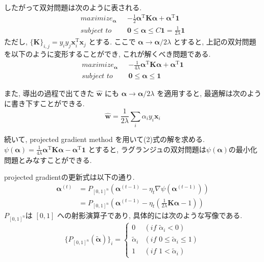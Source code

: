 \documentclass[a4paper,10pt]{jsarticle}
\begin{document}
したがって双対問題は次のように表される.
\begin{align*}
 maximize_{\bm{\alpha}} \,\,\,\,
 & -\frac{1}{2}\bm{\alpha}^\mathrm{T}\bm{K}\mathrm{\bm{\alpha}}
 + \bm{\alpha}^\mathrm{T}\bm{1}\\
 subject \,\, to \,\,\,\, &\bm{0} \leq \bm{\alpha} \leq C\bm{1}
 = \frac{1}{2\lambda}\bm{1}
\end{align*}
ただし, $\{\bm{K}\}_{i, j} = y_iy_j\bm{x}_i^\mathrm{T}\bm{x}_j$ とする.
ここで $\bm{\alpha} \rightarrow \bm{\alpha}/2\lambda$ とすると,
上記の双対問題を以下のように変形することができ, これが解くべき問題である.
\begin{align}
 maximize_{\bm{\alpha}} \,\,\,\,
 & -\frac{1}{4\lambda}\bm{\alpha}^\mathrm{T}\bm{K}\mathrm{\bm{\alpha}}
 + \bm{\alpha}^\mathrm{T}\bm{1}\\
 subject \,\, to \,\,\,\, &\bm{0} \leq \bm{\alpha} \leq \bm{1}
\end{align}

また, 導出の過程で出てきた $\hat{\bm{w}}$ にも
$\bm{\alpha} \rightarrow \bm{\alpha}/2\lambda$ を適用すると,
最適解は次のように書き下すことができる.
\[ \hat{\bm{w}} = \frac{1}{2\lambda}\sum_{i}\alpha_iy_i\bm{x}_i \]

続いて, projected gradient method を用いて(2)式の解を求める.
$\psi(\bm{\alpha}) = \frac{1}{4\lambda}\bm{\alpha}^\mathrm{T}\bm{K}\mathrm{\bm{\alpha}}
 - \bm{\alpha}^\mathrm{T}\bm{1}$
とすると, ラグランジュの双対問題は$\psi(\bm{\alpha})$の最小化問題とみなすことができる.

projected gradientの更新式は以下の通り.
\begin{align*}
 \bm{\alpha}^{(t)}
 & = P_{[0,1]^n}(\bm{\alpha}^{(t-1)} - \eta_t\nabla\psi(\bm{\alpha}^{(t-1)}))\\
 & = P_{[0,1]^n}\left(\bm{\alpha}^{(t-1)} - \eta_t\left(
 \frac{1}{2\lambda}\bm{K}\bm{\alpha} - 1\right)\right)
\end{align*}
$P_{[0,1]^n}$は $[0, 1]$ への射影演算子であり, 具体的には次のような写像である.
\[
  \{P_{[0,1]^n}(\tilde{\bm{\alpha}})\}_i
  = \begin{cases}
     0 &(\mathit{if} \,\, \tilde{\alpha}_i < 0)\\
     \tilde{\alpha}_i &(\mathit{if} \,\, 0 \leq \tilde{\alpha}_i \leq 1)\\
     1 &(\mathit{if} \,\, 1 < \tilde{\alpha}_i)
    \end{cases}
\]
\end{document}
